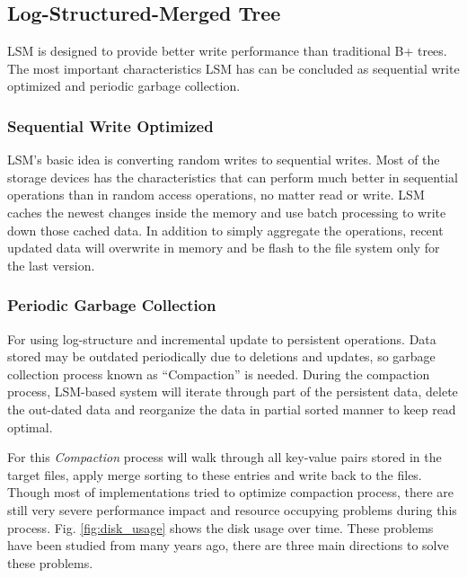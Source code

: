 \subsection{Log-Structured-Merged Tree}\label{LSM-introduction}
LSM is designed to provide better write performance than traditional B+ trees. The most important characteristics LSM has can be concluded as sequential write optimized and periodic garbage collection.

\subsubsection{Sequential Write Optimized} 

LSM's basic idea is converting random writes to sequential writes. Most of the storage devices has the characteristics that can perform much better in sequential operations than in random access operations, no matter read or write. LSM caches the newest changes inside the memory and use batch processing to write down those cached data. In addition to simply aggregate the operations, recent updated data will overwrite in
memory and be flash to the file system only for the last version.

\subsubsection{Periodic Garbage Collection} 

For using log-structure and incremental update to persistent operations. Data stored may be outdated periodically due to deletions and updates, so garbage collection process known as ``Compaction'' is needed. During the compaction process, LSM-based system will iterate through part of the persistent data, delete the out-dated data and reorganize the data in partial sorted manner to keep read optimal.

For this \textit{Compaction} process will walk through all key-value pairs stored in the target files, apply merge sorting to these entries and write back to the files. Though most of implementations tried to optimize compaction process, there are still very severe performance impact and resource occupying problems during this process. Fig. \ref{fig:disk_usage} shows the disk usage over time. These problems have been studied from many years ago, there are three main directions to solve these problems. 

